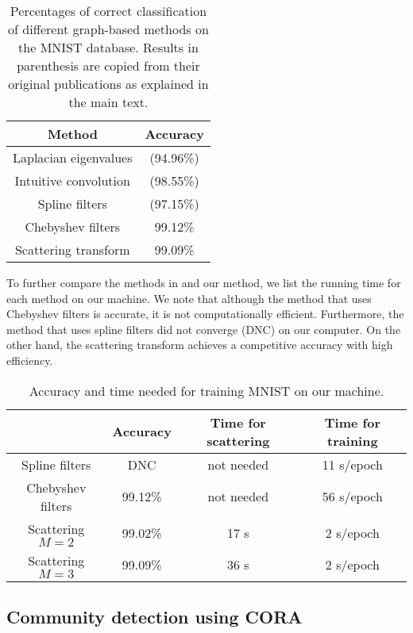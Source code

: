 \documentclass{article}
\begin{document}
\begin{table}[!ht]
\centering
\begin{tabular}{|c|c|}
\hline
Method & Accuracy \\
\hline
 Laplacian eigenvalues \cite{EdwX16} & (94.96\%) \\
\hline
 Intuitive convolution \cite{HecCQ17} & (98.55\%) \\
\hline
 Spline filters \cite{DefBV16} & {(97.15\%)} \\
\hline
 Chebyshev filters \cite{DefBV16} & {99.12}\% \\
 \hline
Scattering transform &  {99.09}\% \\
\hline
\end{tabular}
\caption{Percentages of correct classification of different graph-based methods on the MNIST database. 
{Results in parenthesis are copied from their original publications as explained in the main text.}}
\label{tab:mnistcpr}
\end{table}

{To further compare the methods in \cite{DefBV16} and our method, we list the running time for each method on our machine. We note that although the method that uses Chebyshev filters is accurate, it is not computationally efficient. Furthermore, the method that uses spline filters did not converge (DNC) on our computer. On the other hand, the scattering transform achieves a competitive accuracy with high efficiency. }

\begin{table}[!ht]
\centering
\begin{tabular}{|c|c|c|c|}
\hline
~ & Accuracy & Time for scattering & Time for training \\
\hline
Spline filters  & DNC & not needed & 11 s/epoch \\
\hline
Chebyshev filters  & 99.12\% & not needed & 56 s/epoch \\
\hline
Scattering $M=2$ & 99.02\% & 17 s & 2 s/epoch \\
\hline
Scattering $M=3$ & 99.09\% & 36 s & 2 s/epoch \\
\hline
\end{tabular}
\caption{Accuracy and time needed for training MNIST on our machine.  }
\label{tab:mnisttime}
\end{table}

\subsection{Community detection using CORA}\label{sec:SBM}
\end{document}
